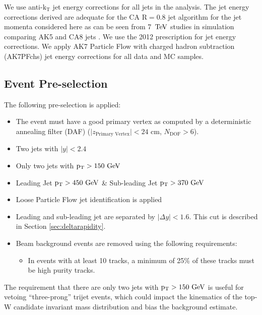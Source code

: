 We use anti-$\mathrm{k_{T}}$ jet energy corrections for all jets in the analysis. 
The jet energy corrections derived are adequate for the CA $\mathrm{R=0.8}$ jet algorithm for the jet momenta
considered here as can be seen from 7~$\mathrm{TeV}$ studies in simulation comparing AK5 and CA8 jets \cite{7tevZprime}.  
We use the 2012 prescription for jet energy corrections\cite{JEC2012}.  We apply AK7 
Particle Flow with charged hadron subtraction 
(AK7PFchs) jet energy corrections for all data and MC samples.

\subsection{Event Pre-selection}
\label{sec:pre-selection}
The following pre-selection is applied:

\begin{itemize}
\item The event must have a good primary vertex as computed by a deterministic annealing filter (DAF)
($\vert z_\text{Primary Vertex}\vert < 24$ cm, $N_\text{DOF} > 6$).
\item Two jets with $|y| < 2.4$
\item Only two jets with $\mathrm{p_{T}} > 150~\mathrm{GeV}$
\item Leading Jet $\mathrm{p_{T}} > 450~\mathrm{GeV}$ \& Sub-leading Jet $\mathrm{p_{T}} > 370~\mathrm{GeV}$
\item Loose Particle Flow jet identification \cite{jetid} is applied
\item Leading and sub-leading jet are separated by $|\Delta y| < 1.6$.  This cut is described in Section \ref{sec:deltarapidity}.
\item Beam background events are removed using the following requirements:
        \begin{itemize}
        \item In events with at least 10 tracks, a minimum of 25\% of
          these tracks must be high purity tracks.
        \end{itemize}
\end{itemize}


The requirement that there are only two jets with $\mathrm{p_{T}} > 150~\mathrm{GeV}$ is useful for vetoing ``three-prong'' trijet events, which could impact the kinematics of the top-W candidate invariant mass 
distribution and bias the background estimate. 

